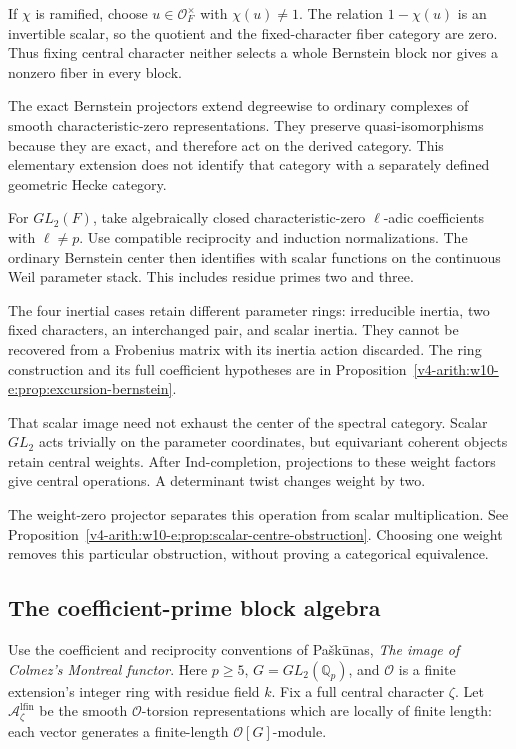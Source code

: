 If $\chi$ is ramified, choose $u\in\mathcal O_F^\times$ with
$\chi(u)\ne1$. The relation $1-\chi(u)$ is an invertible scalar,
so the quotient and the fixed-character fiber category are zero.
Thus fixing central character neither selects a whole Bernstein
block nor gives a nonzero fiber in every block.


The exact Bernstein projectors extend degreewise to ordinary
complexes of smooth characteristic-zero representations. They
preserve quasi-isomorphisms because they are exact, and therefore
act on the derived category.
This elementary extension does not identify that category with a
separately defined geometric Hecke category.

For \(GL_2(F)\), take algebraically closed characteristic-zero
\(\ell\)-adic coefficients with \(\ell\ne p\).
Use compatible reciprocity and induction normalizations.
The ordinary Bernstein center then identifies with scalar functions
on the continuous Weil parameter stack.
This includes residue primes two and three.

The four inertial cases retain different parameter rings:
irreducible inertia, two fixed characters, an interchanged pair,
and scalar inertia. They cannot be recovered from a Frobenius
matrix with its inertia action discarded.
The ring construction and its full coefficient hypotheses are in
Proposition~\ref{v4-arith:w10-e:prop:excursion-bernstein}.

That scalar image need not exhaust the center of the spectral
category. Scalar \(GL_2\) acts trivially on the parameter coordinates,
but equivariant coherent objects retain central weights.
After Ind-completion, projections to these weight factors give
central operations. A determinant twist changes weight by two.

The weight-zero projector separates this operation from scalar
multiplication. See
Proposition~\ref{v4-arith:w10-e:prop:scalar-centre-obstruction}.
Choosing one weight removes this particular obstruction, without
proving a categorical equivalence.

\subsection{The coefficient-prime block algebra}

Use the coefficient and reciprocity conventions of
Pa\v{s}k\={u}nas, \emph{The image of Colmez's Montreal functor}.
Here \(p\ge5\), \(G=GL_2(\mathbb Q_p)\), and
\(\mathcal O\) is a finite extension's integer ring with residue
field \(k\). Fix a full central character \(\zeta\).
Let \(\mathcal A_\zeta^{\mathrm{lfin}}\) be the smooth
\(\mathcal O\)-torsion representations which are locally of finite
length: each vector generates a finite-length \(\mathcal O[G]\)-module.

